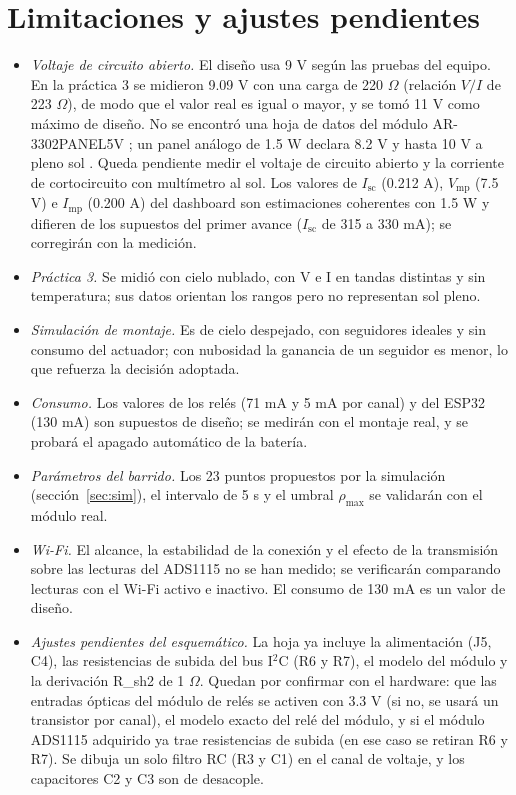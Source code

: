 \documentclass[10pt,letterpaper,twocolumn]{article}
\begin{document}
\section{Limitaciones y ajustes pendientes}\label{sec:limit}
\begin{itemize}
\item \emph{Voltaje de circuito abierto.} El diseño usa 9 V según las pruebas del equipo. En la práctica 3 se midieron 9.09 V con una carga de 220 $\Omega$ (relación $V/I$ de 223 $\Omega$), de modo que el valor real es igual o mayor, y se tomó 11 V como máximo de diseño. No se encontró una hoja de datos del módulo AR-3302PANEL5V \cite{etiqueta}; un panel análogo de 1.5 W declara 8.2 V y hasta 10 V a pleno sol \cite{seeed}. Queda pendiente medir el voltaje de circuito abierto y la corriente de cortocircuito con multímetro al sol. Los valores de $I_\mathrm{sc}$ (0.212 A), $V_\mathrm{mp}$ (7.5 V) e $I_\mathrm{mp}$ (0.200 A) del dashboard son estimaciones coherentes con 1.5 W y difieren de los supuestos del primer avance ($I_\mathrm{sc}$ de 315 a 330 mA); se corregirán con la medición.
\item \emph{Práctica 3.} Se midió con cielo nublado, con V e I en tandas distintas y sin temperatura; sus datos orientan los rangos pero no representan sol pleno.
\item \emph{Simulación de montaje.} Es de cielo despejado, con seguidores ideales y sin consumo del actuador; con nubosidad la ganancia de un seguidor es menor, lo que refuerza la decisión adoptada.
\item \emph{Consumo.} Los valores de los relés (71 mA y 5 mA por canal) y del ESP32 (130 mA) son supuestos de diseño; se medirán con el montaje real, y se probará el apagado automático de la batería.
\item \emph{Parámetros del barrido.} Los 23 puntos propuestos por la simulación (sección~\ref{sec:sim}), el intervalo de 5 s y el umbral $\rho_\mathrm{max}$ se validarán con el módulo real.
\item \emph{Wi-Fi.} El alcance, la estabilidad de la conexión y el efecto de la transmisión sobre las lecturas del ADS1115 no se han medido; se verificarán comparando lecturas con el Wi-Fi activo e inactivo. El consumo de 130 mA es un valor de diseño.
\item \emph{Ajustes pendientes del esquemático.} La hoja ya incluye la alimentación (J5, C4), las resistencias de subida del bus I$^2$C (R6 y R7), el modelo del módulo y la derivación R\_sh2 de 1 $\Omega$. Quedan por confirmar con el hardware: que las entradas ópticas del módulo de relés se activen con 3.3 V (si no, se usará un transistor por canal), el modelo exacto del relé del módulo, y si el módulo ADS1115 adquirido ya trae resistencias de subida (en ese caso se retiran R6 y R7). Se dibuja un solo filtro RC (R3 y C1) en el canal de voltaje, y los capacitores C2 y C3 son de desacople.

\end{itemize}
\end{document}
